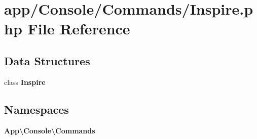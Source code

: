 \section{app/\+Console/\+Commands/\+Inspire.php File Reference}
\label{_inspire_8php}
\subsection*{Data Structures}
\begin{DoxyCompactItemize}
\item 
class {\bf Inspire}
\end{DoxyCompactItemize}
\subsection*{Namespaces}
\begin{DoxyCompactItemize}
\item 
 {\bf App\textbackslash{}\+Console\textbackslash{}\+Commands}
\end{DoxyCompactItemize}
